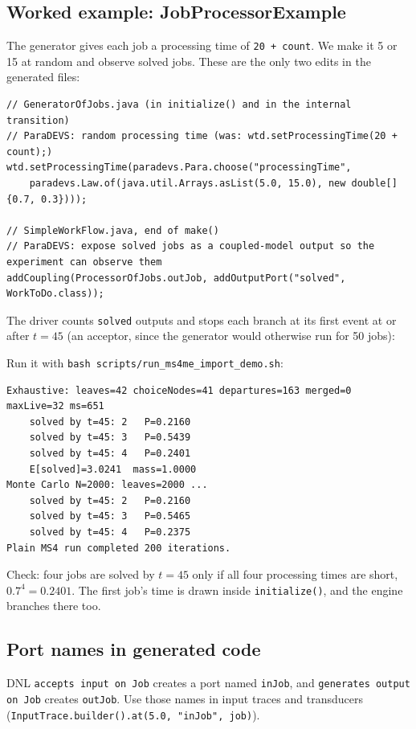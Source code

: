 \documentclass[11pt]{article}
\newcommand{\code}[1]{\texttt{#1}}
\newcommand{\src}{../../src}
\begin{document}
\subsection{Worked example: JobProcessorExample}
The generator gives each job a processing time of \code{20 + count}. We make it 5 or 15 at random and observe solved
jobs. These are the only two edits in the generated files:
\begin{lstlisting}
// GeneratorOfJobs.java (in initialize() and in the internal transition)
// ParaDEVS: random processing time (was: wtd.setProcessingTime(20 + count);)
wtd.setProcessingTime(paradevs.Para.choose("processingTime",
    paradevs.Law.of(java.util.Arrays.asList(5.0, 15.0), new double[] {0.7, 0.3})));

// SimpleWorkFlow.java, end of make()
// ParaDEVS: expose solved jobs as a coupled-model output so the experiment can observe them
addCoupling(ProcessorOfJobs.outJob, addOutputPort("solved", WorkToDo.class));
\end{lstlisting}
The driver counts \code{solved} outputs and stops each branch at its first event at or after $t=45$ (an acceptor, since
the generator would otherwise run for 50 jobs):

Run it with \code{bash scripts/run\_ms4me\_import\_demo.sh}:
\begin{lstlisting}[style=plain]
Exhaustive: leaves=42 choiceNodes=41 departures=163 merged=0 maxLive=32 ms=651
    solved by t=45: 2   P=0.2160
    solved by t=45: 3   P=0.5439
    solved by t=45: 4   P=0.2401
    E[solved]=3.0241  mass=1.0000
Monte Carlo N=2000: leaves=2000 ...
    solved by t=45: 2   P=0.2160
    solved by t=45: 3   P=0.5465
    solved by t=45: 4   P=0.2375
Plain MS4 run completed 200 iterations.
\end{lstlisting}
Check: four jobs are solved by $t=45$ only if all four processing times are short, $0.7^4 = 0.2401$. The first job's
time is drawn inside \code{initialize()}, and the engine branches there too.

\subsection{Port names in generated code}
DNL \code{accepts input on Job} creates a port named \code{inJob}, and \code{generates output on Job} creates \code{outJob}.
Use those names in input traces and transducers (\code{InputTrace.builder().at(5.0, "inJob", job)}).
\end{document}
